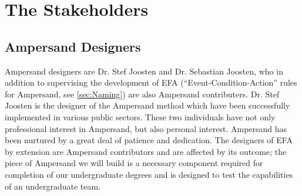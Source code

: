 \documentclass[12pt]{report}
\begin{document}
\section{The Stakeholders}\label{sec:Stakeholders}

\subsection{Ampersand Designers}\label{subsec:Ampersand}
Ampersand designers are Dr. Stef Joosten and Dr. Sebastian Joosten, who in
addition to supervising the development of EFA (``Event-Condition-Action'' rules
for Ampersand, see \ref{sec:Naming}) are also Ampersand
contributers. Dr. Stef Joosten is the designer of the Ampersand method which
have been successfully implemented in various public sectors. These two individuals have not only professional interest in Ampersand, but also personal interest.
Ampersand has been nurtured by a great deal of patience and
dedication. The designers of EFA by extension are Ampersand contributors and
are affected by its outcome; the piece of Ampersand we will build is a necessary
component required for completion of our undergraduate degrees and is designed 
to test the capabilities of an undergraduate team. 
\end{document}
